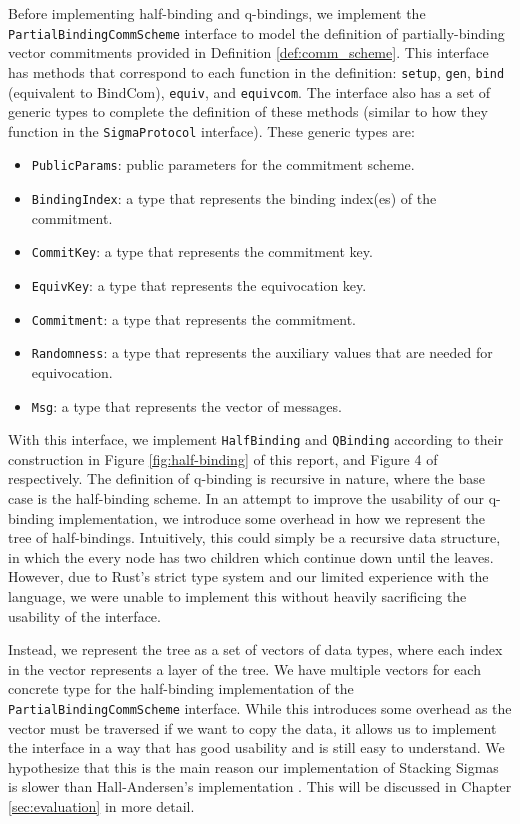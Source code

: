 Before implementing half-binding and q-bindings, we implement the \texttt{PartialBindingCommScheme} interface 
to model the definition of partially-binding vector commitments provided in Definition \ref{def:comm_scheme}. 
This interface has methods that correspond to each function in the definition: \texttt{setup}, \texttt{gen}, 
\texttt{bind} (equivalent to \textsf{BindCom}), \texttt{equiv}, and \texttt{equivcom}. 
The interface also has a set of generic types to complete the definition of these methods (similar to how 
they function in the \texttt{SigmaProtocol} interface). These generic types are:
\begin{itemize}
  \item \texttt{PublicParams}: public parameters for the commitment scheme. 
  \item \texttt{BindingIndex}: a type that represents the binding index(es) of the commitment. 
  \item \texttt{CommitKey}: a type that represents the commitment key.
  \item \texttt{EquivKey}: a type that represents the equivocation key. 
  \item \texttt{Commitment}: a type that represents the commitment.
  \item \texttt{Randomness}: a type that represents the auxiliary values that are needed for equivocation. 
  \item \texttt{Msg}: a type that represents the vector of messages. 
\end{itemize}

With this interface, we implement \texttt{HalfBinding} and \texttt{QBinding} according to their 
construction in Figure \ref{fig:half-binding} of this report, and Figure 4 of \cite{StackingSigmas} 
respectively. The definition of q-binding is recursive in nature, where the base case is the 
half-binding scheme. In an attempt to improve the usability of our q-binding implementation, we introduce 
some overhead in how we represent the tree of half-bindings. Intuitively, this could simply be a 
recursive data structure, in which the every node has two children which continue down until the leaves. 
However, due to Rust's strict type system and our limited experience with the language, we were unable 
to implement this without heavily sacrificing the usability of the interface. 

Instead, we represent the tree as a set of vectors of data types, where each index in the vector represents a 
layer of the tree. We have multiple vectors for each concrete type for the half-binding implementation of the 
\texttt{PartialBindingCommScheme} interface. While this introduces some overhead as the vector must be 
traversed if we want to copy the data, it allows us to implement the interface in a way that has good 
usability and is still easy to understand. We hypothesize that this is the main reason our implementation of 
Stacking Sigmas is slower than Hall-Andersen's implementation \cite{MHAStackSig}. This will be discussed in 
Chapter \ref{sec:evaluation} in more detail.